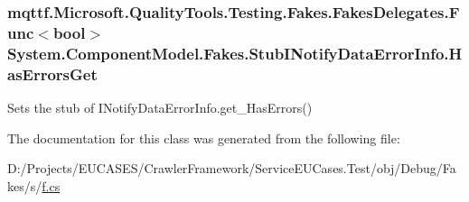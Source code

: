 \hypertarget{class_system_1_1_component_model_1_1_fakes_1_1_stub_i_notify_data_error_info_acc1b90d132ee1fcf1742e58f46d3bacb}{
\subsubsection[{Has\-Errors\-Get}]{\setlength{\rightskip}{0pt plus 5cm}mqttf.\-Microsoft.\-Quality\-Tools.\-Testing.\-Fakes.\-Fakes\-Delegates.\-Func$<$bool$>$ System.\-Component\-Model.\-Fakes.\-Stub\-I\-Notify\-Data\-Error\-Info.\-Has\-Errors\-Get}}\label{class_system_1_1_component_model_1_1_fakes_1_1_stub_i_notify_data_error_info_acc1b90d132ee1fcf1742e58f46d3bacb}


Sets the stub of I\-Notify\-Data\-Error\-Info.\-get\-\_\-\-Has\-Errors()



The documentation for this class was generated from the following file\-:\begin{DoxyCompactItemize}
\item 
D\-:/\-Projects/\-E\-U\-C\-A\-S\-E\-S/\-Crawler\-Framework/\-Service\-E\-U\-Cases.\-Test/obj/\-Debug/\-Fakes/s/\hyperlink{s_2f_8cs}{f.\-cs}\end{DoxyCompactItemize}
